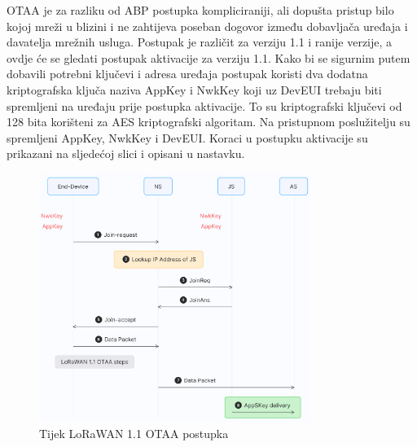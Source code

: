 \documentclass[times, utf8, diplomski]{fer}
\begin{document}
OTAA je za razliku od ABP postupka kompliciraniji, ali dopušta pristup bilo kojoj mreži u blizini i ne zahtijeva poseban dogovor između dobavljača uređaja i davatelja mrežnih usluga. Postupak je različit za verziju 1.1 i ranije verzije, a ovdje će se gledati postupak aktivacije za verziju 1.1. Kako bi se sigurnim putem dobavili potrebni ključevi i adresa uređaja postupak koristi dva dodatna kriptografska ključa naziva AppKey i NwkKey koji uz DevEUI trebaju biti spremljeni na uređaju prije postupka aktivacije. To su kriptografski ključevi od 128 bita korišteni za AES kriptografski algoritam. Na pristupnom poslužitelju su spremljeni AppKey, NwkKey i DevEUI. Koraci u postupku aktivacije su prikazani na sljedećoj slici i opisani u nastavku.
\begin{figure}[H]
    \centering
    \includegraphics[width=8.8cm]{images/otaa.png}
    \caption{Tijek LoRaWAN 1.1 OTAA postupka\citep{LoRaWAN}}
    \label{fig:otaa}
\end{figure}
\end{document}
